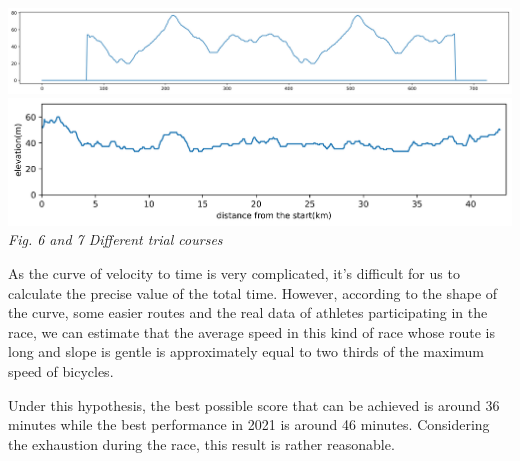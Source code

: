 \documentclass{article}
\begin{document}
		\begin{center}
			\includegraphics[width=15cm]{6.png}\\
			\includegraphics[width=15cm]{7.png}\\
			\small \textit{Fig. 6 and 7  Different trial courses}
		\end{center}

		As the curve of velocity to time is very complicated, it's difficult for us to calculate the precise value of the total time. However, according to the shape of the curve, some easier routes and the real data of athletes participating in the race, we can estimate that the average speed in this kind of race whose route is long and slope is gentle is approximately equal to two thirds of the maximum speed of bicycles.

		Under this hypothesis, the best possible score that can be achieved is around 36 minutes while the best performance in 2021 is around 46 minutes. Considering the exhaustion during the race, this result is rather reasonable.
\end{document}
